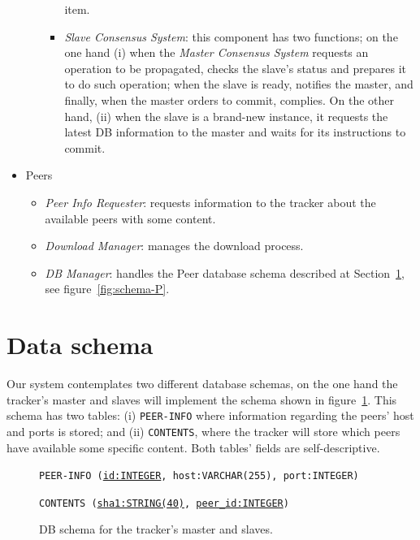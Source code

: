\documentclass[twoside,a4paper,10pt]{article}
\begin{document}
\begin{itemize}
\begin{itemize}
\begin{itemize}
      item.
    \item \emph{Slave Consensus System}: this component has two functions; on
      the one hand
      (i) when the \emph{Master Consensus System} requests an operation to be
      propagated, checks the slave's status and prepares it to do such
      operation; when the slave is ready, notifies the master, and finally, when
      the master orders to commit, complies. On the other hand, (ii) when the
      slave is a brand-new instance, it requests the latest DB information to
      the master and waits for its instructions to commit.
    \end{itemize}
  \end{itemize}
\item Peers
  \begin{itemize}
  \item \emph{Peer Info Requester}: requests information to the tracker about
    the available peers with some content.
  \item \emph{Download Manager}: manages the download process.
  \item \emph{DB Manager}: handles the Peer database schema described at
    Section~\ref{sec:data-schema}, see figure~\ref{fig:schema-P}.
  \end{itemize}
\end{itemize}


\section{Data schema}\label{sec:data-schema}

Our system contemplates two different database schemas, on the one hand the
tracker's master and slaves will implement the schema shown in
figure~\ref{fig:schema-MS}. This schema has two tables: (i) \texttt{PEER-INFO}
where information regarding the peers' host and ports is stored; and (ii)
\texttt{CONTENTS}, where the tracker will store which peers have available some
specific content. Both tables' fields are self-descriptive.

\begin{figure}[h]
  
  \texttt{PEER-INFO (\underline{id:INTEGER}, host:VARCHAR(255), port:INTEGER)}
  
  \texttt{CONTENTS (\underline{sha1:STRING(40)}, \underline{peer\_id:INTEGER})}
  
  \centering
  \caption{\label{fig:schema-MS}DB schema for the tracker's master and slaves.}
\end{figure}
\end{document}
